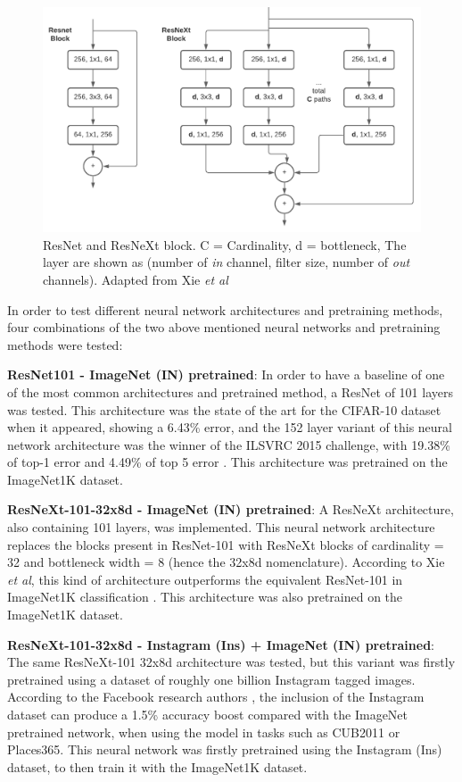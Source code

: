 \documentclass[11pt,onecolumn,titlepage,letterpaper]{article}
\begin{document}
\begin{figure}[h]
	\begin{center}
		\includegraphics[width=0.8\linewidth]{resnet_resnext_block.pdf}
	\end{center}
	\caption{ResNet and ResNeXt block. C = Cardinality, d = bottleneck, The layer are shown as (number of \textit{in} channel, filter size, number of \textit{out} channels). Adapted from Xie \textit{et al} \cite{Xie2017}}
	\label{fig:resnet}
\end{figure}

In order to test different neural network architectures and pretraining methods, four combinations of the two above mentioned neural networks and pretraining methods were tested:

\textbf{ResNet101 - ImageNet (IN) pretrained}: In order to have a baseline of one of the most common architectures and pretrained method, a ResNet of 101 layers was tested. This architecture was the state of the art for the CIFAR-10 dataset when it appeared, showing a 6.43\% error, and the 152 layer variant of this neural network architecture was the winner of the ILSVRC 2015 challenge, with 19.38\% of top-1 error and 4.49\% of top 5 error \cite{He2016}. This architecture was pretrained on the ImageNet1K dataset.

\textbf{ResNeXt-101-32x8d - ImageNet (IN) pretrained}: A ResNeXt architecture, also containing 101 layers, was implemented. This neural network architecture replaces the blocks present in ResNet-101 with ResNeXt blocks of cardinality = 32 and bottleneck width = 8 (hence the 32x8d nomenclature). According to Xie \textit{et al}, this kind of architecture outperforms the equivalent ResNet-101 in ImageNet1K classification \cite{Xie2017}. This architecture was also pretrained on the ImageNet1K dataset.

\textbf{ResNeXt-101-32x8d - Instagram (Ins) + ImageNet (IN) pretrained}: The same ResNeXt-101 32x8d architecture was tested, but this variant was firstly pretrained using a dataset of roughly one billion Instagram tagged images. According to the Facebook research authors \cite{Mahajan2018}, the inclusion of the Instagram dataset can produce a 1.5\% accuracy boost compared with the ImageNet pretrained network, when using the model in tasks such as CUB2011 or Places365. This neural network was firstly pretrained using the Instagram (Ins) dataset, to then train it with the ImageNet1K dataset.
\end{document}
